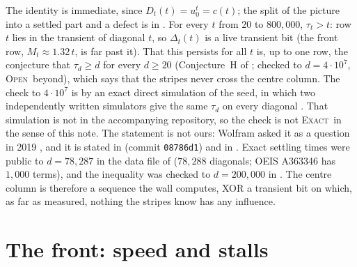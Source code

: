 \documentclass[11pt]{article}
\theoremstyle{definition}
\theoremstyle{remark}
\newcommand{\EXACT}{\textsc{Exact}}
\newcommand{\OPEN}{\textsc{Open}}
\begin{document}
The identity is immediate, since $D_t(t)=u^t_0=c(t)$; the split of the picture into a settled part and a defect is in \cite{Dib2}. For every $t$ from $20$ to $800{,}000$, $\tau_t>t$: row $t$ lies in the transient of diagonal $t$, so $\Delta_t(t)$ is a live transient bit (the front row, $M_t\approx1.32\,t$, is far past it). That this persists for all $t$ is, up to one row, the conjecture that $\tau_d\ge d$ for every $d\ge20$ (Conjecture~H of \cite{B}; checked to $d=4\cdot10^7$, \OPEN\ beyond), which says that the stripes never cross the centre column. The check to $4\cdot10^7$ is by an exact direct simulation of the seed, in which two independently written simulators give the same $\tau_d$ on every diagonal \cite{B}. That simulation is not in the accompanying repository, so the check is not \EXACT\ in the sense of this note. The statement is not ours: Wolfram asked it as a question in 2019 \cite{Wolfram}, and it is stated in \cite{Pat2} (commit \texttt{08786d1}) and in \cite{Dib2}. Exact settling times were public to $d=78{,}287$ in the data file of \cite{Wolfram} ($78{,}288$ diagonals; OEIS A363346 has $1{,}000$ terms), and the inequality was checked to $d=200{,}000$ in \cite{Dib2}. The centre column is therefore a sequence the wall computes, XOR a transient bit on which, as far as measured, nothing the stripes know has any influence.

\section{The front: speed and stalls}
\end{document}
